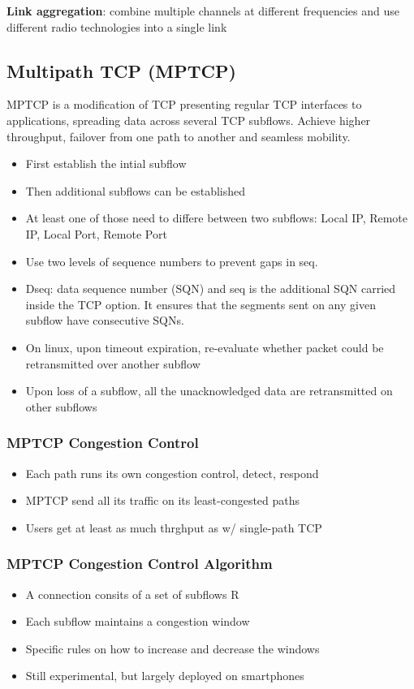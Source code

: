 \textbf{Link aggregation}: combine multiple channels at different frequencies and use different radio technologies into a single link


\subsection{Multipath TCP (MPTCP)}
MPTCP is a modification of TCP presenting regular TCP interfaces to applications, spreading data across several TCP subflows. Achieve higher throughput, failover from one path to another and seamless mobility.
\begin{itemize}
	\item First establish the intial subflow
	\item Then additional subflows can be established
	\item At least one of those need to differe between two subflows: Local IP, Remote IP, Local Port, Remote Port
	\item Use two levels of sequence numbers to prevent gaps in seq.
	\item Dseq: data sequence number (SQN) and seq is the additional SQN carried inside the TCP option. It ensures that the segments sent on any given subflow have consecutive SQNs.
	\item On linux, upon timeout expiration, re-evaluate whether packet could be retransmitted over another subflow
	\item Upon loss of a subflow, all the unacknowledged data are retransmitted on other subflows
\end{itemize}

\subsubsection{MPTCP Congestion Control}
\begin{itemize}
	\item Each path runs its own congestion control, detect, respond
	\item MPTCP send all its traffic on its least-congested paths
	\item Users get at least as much thrghput as w/ single-path TCP
\end{itemize}

\subsubsection{MPTCP Congestion Control Algorithm}
\begin{itemize}
	\item A connection consits of a set of subflows R
	\item Each subflow maintains a congestion window
	\item Specific rules on how to increase and decrease the windows
	\item Still experimental, but largely deployed on smartphones
\end{itemize}
